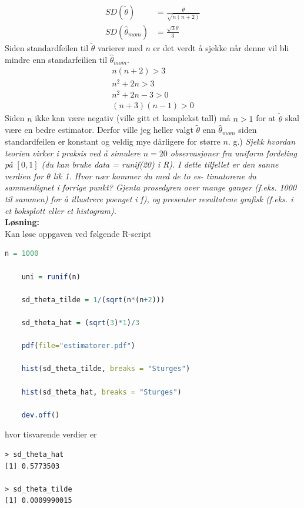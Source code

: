 \documentclass[12pt,
               a4paper,
               article,
               oneside,
               oldfontcommands,
               norsk]{memoir}
\begin{document}
\begin{align*}
    SD(\tilde{\theta}) &= \frac{\theta}{\sqrt{n(n+2)}} \\[7pt]
    SD(\hat{\theta}_{mom}) &= \frac{\sqrt{3} \theta}{3}
\end{align*}
Siden standardfeilen til $\tilde{\theta}$ varierer med $n$ er det verdt å sjekke når denne vil bli mindre enn standarfeilien til $\hat{\theta}_{mom}$.
\begin{align*}
    n(n+2) > 3 \\[7pt]
    n^2 + 2n > 3  \\[7pt]
    n^2 + 2n - 3 > 0 \\[7pt]
    (n + 3)(n-1) > 0
\end{align*}
Siden $n$ ikke kan være negativ (ville gitt et komplekst tall) må $n > 1$ for at $\tilde{\theta}$ skal være en bedre estimator. Derfor ville jeg heller valgt $\tilde{\theta}$ enn $\hat{\theta}_{mom}$ siden standardfeilen er konstant og veldig mye dårligere for større $n$.
g.) \emph{Sjekk hvordan teorien virker i praksis ved å simulere $n = 20$ observasjoner fra uniform fordeling på $[0,1]$ (du kan bruke data = runif(20) i R). I dette tilfellet er den sanne verdien for $\theta$ lik 1. Hvor nær kommer du med de to es- timatorene du sammenlignet i forrige punkt? Gjenta prosedyren over mange ganger (f.eks. 1000 til sammen) for å illustrere poenget i f), og presenter resultatene grafisk (f.eks. i et boksplott eller et histogram).}
\vspace{3mm}\\
\textbf{Løsning:}\vspace{3mm}\\
Kan løse oppgaven ved følgende R-script
\begin{lstlisting}[language=R]
    n = 1000

    uni = runif(n)

    sd_theta_tilde = 1/(sqrt(n*(n+2)))

    sd_theta_hat = (sqrt(3)*1)/3

    pdf(file="estimatorer.pdf")

    hist(sd_theta_tilde, breaks = "Sturges")

    hist(sd_theta_hat, breaks = "Sturges")

    dev.off()
    \end{lstlisting}
hvor tisvarende verdier er 
\begin{verbatim}
> sd_theta_hat
[1] 0.5773503

> sd_theta_tilde
[1] 0.0009990015
\end{verbatim}
\end{document}
